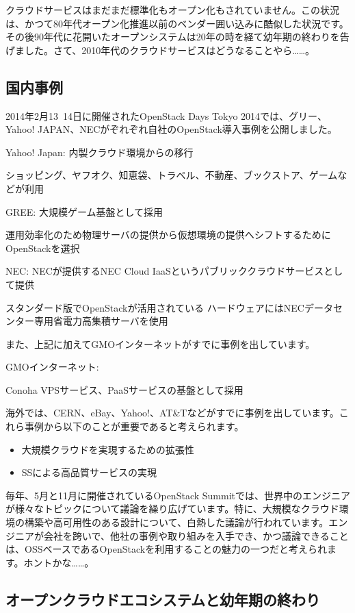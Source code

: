 \documentclass[8pt,b5paper,tombo,openany]{jsbook}
\begin{document}
クラウドサービスはまだまだ標準化もオープン化もされていません。この状況は、かつて80年代オープン化推進以前のベンダー囲い込みに酷似した状況です。その後90年代に花開いたオープンシステムは20年の時を経て幼年期の終わりを告げました。さて、2010年代のクラウドサービスはどうなることやら……。

\subsection{国内事例}

2014年2月13~14日に開催されたOpenStack Days Tokyo 2014では、グリー、Yahoo! JAPAN、NECがぞれぞれ自社のOpenStack導入事例を公開しました。

Yahoo! Japan: 内製クラウド環境からの移行

ショッピング、ヤフオク、知恵袋、トラベル、不動産、ブックストア、ゲームなどが利用

GREE: 大規模ゲーム基盤として採用

運用効率化のため物理サーバの提供から仮想環境の提供へシフトするためにOpenStackを選択

NEC: NECが提供するNEC Cloud IaaSというパブリッククラウドサービスとして提供

スタンダード版でOpenStackが活用されている
ハードウェアにはNECデータセンター専用省電力高集積サーバを使用

また、上記に加えてGMOインターネットがすでに事例を出しています。

GMOインターネット:

Conoha VPSサービス、PaaSサービスの基盤として採用

海外では、CERN、eBay、Yahoo!、AT\&Tなどがすでに事例を出しています。これら事例から以下のことが重要であると考えられます。

\begin{itemize}
  \item 大規模クラウドを実現するための拡張性
  \item SSによる高品質サービスの実現
\end{itemize}

毎年、5月と11月に開催されているOpenStack Summitでは、世界中のエンジニアが様々なトピックについて議論を繰り広げています。特に、大規模なクラウド環境の構築や高可用性のある設計について、白熱した議論が行われています。エンジニアが会社を跨いで、他社の事例や取り組みを入手でき、かつ議論できることは、OSSベースであるOpenStackを利用することの魅力の一つだと考えられます。ホントかな……。

\subsection{オープンクラウドエコシステムと幼年期の終わり}
\end{document}
